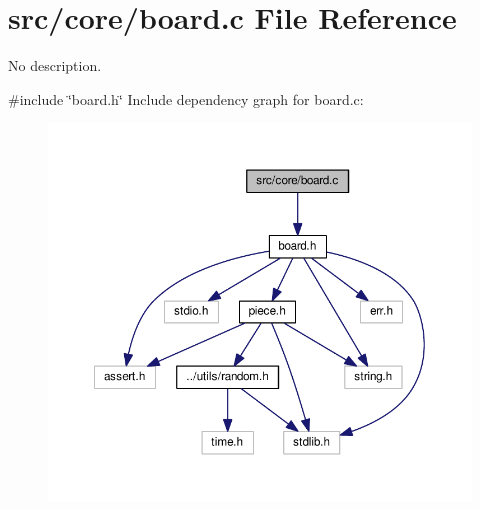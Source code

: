 \section{src/core/board.c File Reference}
\label{board_8c}


No description.  


{\ttfamily \#include \char`\"{}board.\+h\char`\"{}}\newline
Include dependency graph for board.\+c\+:
\nopagebreak
\begin{figure}[H]
\begin{center}
\leavevmode
\includegraphics[width=350pt]{board_8c__incl}
\end{center}
\end{figure}
